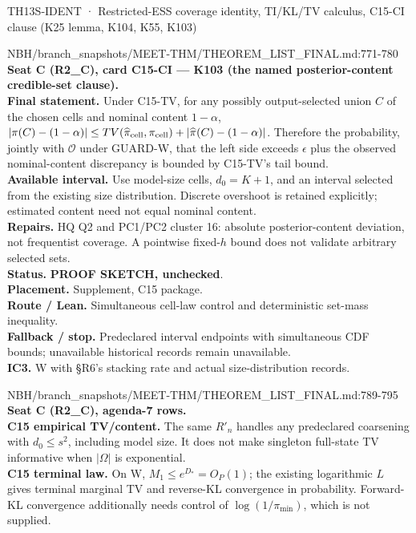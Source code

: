 \begin{card}{TH13}{S-IDENT · Restricted-ESS coverage identity, TI/KL/TV calculus, C15-CI clause (K25 lemma, K104, K55, K103)}
\begin{stmt}{NBH/branch_snapshots/MEET-THM/THEOREM_LIST_FINAL.md:771-780}
\textbf{Seat C (R2\_C), card C15-CI — K103 (the named posterior-content credible-set clause).}\\
\textbf{Final statement.} Under C15-TV, for any possibly output-selected union $C$ of the chosen cells and nominal content $1-\alpha$, $\lvert\pi(C)-(1-\alpha)\rvert\le TV(\widehat\pi_{\rm cell},\pi_{\rm cell})+\lvert\widehat\pi(C)-(1-\alpha)\rvert$. Therefore the probability, jointly with $\mathcal O$ under GUARD-W, that the left side exceeds $\epsilon$ plus the observed nominal-content discrepancy is bounded by C15-TV’s tail bound.\\
\textbf{Available interval.} Use model-size cells, $d_0=K+1$, and an interval selected from the existing size distribution. Discrete overshoot is retained explicitly; estimated content need not equal nominal content.\\
\textbf{Repairs.} HQ Q2 and PC1/PC2 cluster 16: absolute posterior-content deviation, not frequentist coverage. A pointwise fixed-$h$ bound does not validate arbitrary selected sets.\\
\textbf{Status.} \textbf{PROOF SKETCH, unchecked}.\\
\textbf{Placement.} Supplement, C15 package.\\
\textbf{Route / Lean.} Simultaneous cell-law control and deterministic set-mass inequality.\\
\textbf{Fallback / stop.} Predeclared interval endpoints with simultaneous CDF bounds; unavailable historical records remain unavailable.\\
\textbf{IC3.} W with §R6’s stacking rate and actual size-distribution records.
\end{stmt}

\begin{stmt}{NBH/branch_snapshots/MEET-THM/THEOREM_LIST_FINAL.md:789-795}
\textbf{Seat C (R2\_C), agenda-7 rows.}\\
\textbf{C15 empirical TV/content.} The same $R'_n$ handles any predeclared coarsening with $d_0\le s^2$, including model size. It does not make singleton full-state TV informative when $\lvert\Omega\rvert$ is exponential.\\
\textbf{C15 terminal law.} On W, $M_1\le e^{D_*}=O_P(1)$; the existing logarithmic $L$ gives terminal marginal TV and reverse-KL convergence in probability. Forward-KL convergence additionally needs control of $\log(1/\pi_{\min})$, which is not supplied.
\end{stmt}


\end{card}
